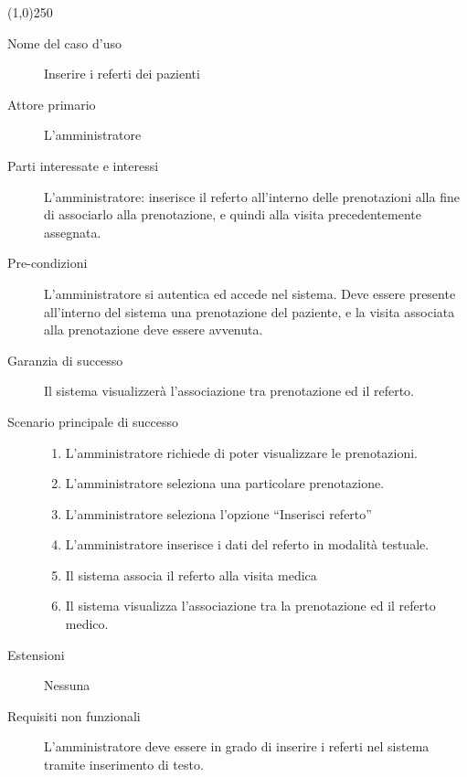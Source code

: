 \begin{center}
\line(1,0){250}
\end{center}




\begin{description}
\item[Nome del caso d'uso]
       	Inserire i referti dei pazienti

\item[Attore primario]
        L'amministratore

\item[Parti interessate e interessi]
        L'amministratore: inserisce il referto all'interno delle prenotazioni alla fine
        di associarlo alla prenotazione, e quindi alla visita precedentemente 
        assegnata.

\item[Pre-condizioni]
	L'amministratore si autentica ed accede nel sistema.
        Deve essere presente all'interno del sistema una prenotazione del paziente,
        e la visita associata alla prenotazione deve essere avvenuta.

\item[Garanzia di successo]
        Il sistema visualizzerà l'associazione tra prenotazione ed il referto.

\item[Scenario principale di successo]
\begin{enumerate}
\item L'amministratore richiede di poter visualizzare le prenotazioni.
\item L'amministratore seleziona una particolare prenotazione.
\item L'amministratore seleziona l'opzione ``Inserisci referto''
\item L'amministratore inserisce i dati del referto in modalità testuale.
\item Il sistema associa il referto alla visita medica
\item Il sistema visualizza l'associazione tra la prenotazione ed il referto medico.

\end{enumerate}

\item[Estensioni]
	Nessuna


\item[Requisiti non funzionali]
\begin{itemize}
\diam L'amministratore deve essere in grado di inserire i referti nel sistema
	tramite inserimento di testo.
\end{itemize}
\end{description}

